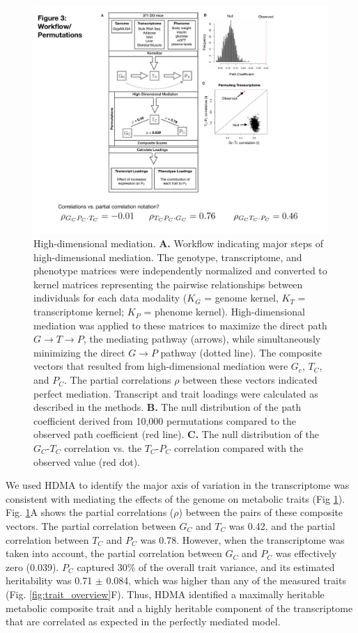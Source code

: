\documentclass[
]{article}
\begin{document}
\begin{figure}[ht!]
\includegraphics[width=5in]{Figures/Fig3_workflow.pdf} 
\caption{High-dimensional mediation. \textbf{A.} Workflow indicating 
major steps of high-dimensional mediation. The genotype, transcriptome, 
and phenotype matrices were independently normalized and converted to 
kernel matrices representing the pairwise relationships between 
individuals for each data modality ($K_G$ = genome kernel, $K_T$ = 
transcriptome kernel; $K_P$ = phenome kernel). 
High-dimensional mediation was applied to these matrices to maximize the 
direct path $G \rightarrow T \rightarrow P$, the mediating pathway (arrows), 
while simultaneously minimizing the direct $G \rightarrow P$ pathway (dotted 
line). The composite vectors that resulted from high-dimensional mediation were 
$G_c$, $T_C$, and $P_C$. The partial correlations $\rho$ between these vectors 
indicated perfect mediation. Transcript and trait loadings were calculated 
as described in the methods. \textbf{B.} The null distribution of the path 
coefficient derived from 10,000 permutations compared to the observed path 
coefficient (red line). \textbf{C.} The null distribution of the $G_C$-$T_C$ 
correlation vs. the $T_C$-$P_C$ correlation compared with the observed value 
(red dot).
}
\label{fig:workflow}
\end{figure}

We used HDMA to identify the major axis of variation in the
transcriptome was consistent with mediating the effects of the genome on
metabolic traits (Fig \ref{fig:workflow}). Fig. \ref{fig:workflow}A
shows the partial correlations (\(\rho\)) between the pairs of these
composite vectors. The partial correlation between \(G_C\) and \(T_C\)
was 0.42, and the partial correlation between \(T_C\) and \(P_C\) was
0.78. However, when the transcriptome was taken into account, the
partial correlation between \(G_C\) and \(P_C\) was effectively zero
(0.039). \(P_C\) captured 30\% of the overall trait variance, and its
estimated heritability was 0.71 \(\pm\) 0.084, which was higher than any
of the measured traits (Fig. \ref{fig:trait_overview}F). Thus, HDMA
identified a maximally heritable metabolic composite trait and a highly
heritable component of the transcriptome that are correlated as expected
in the perfectly mediated model.
\end{document}

